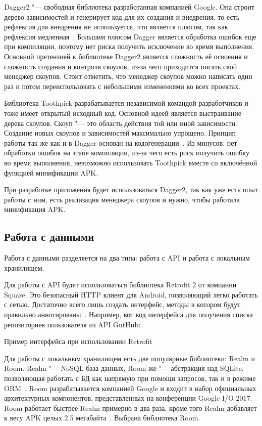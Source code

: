 Dagger2 "--- свободная библиотека разработанная компанией Google.
Она строит дерево зависимостей и генерирует код для их создания и внедрения, то есть рефлексия для внедрения не используется, что является плюсом, так как рефлексия медленная~\cite{dagger}.
Большим плюсом Dagger является обработка ошибок еще при компиляции, поэтому нет риска получить исключение во время выполнения.
Основной претензией к библиотеке Dagger2 является сложность её освоения и сложность создания и контроля скоупов, из-за чего приходится писать свой менеджер скоупов.
Стоит отметить, что менеджер скоупов можно написать один раз и потом переиспользовать с небольшими изменениями во всех проектах.

Библиотека Toothpick разрабатывается независимой командой разработчиков и тоже имеет открытый исходный код.
Основной идеей является выстраивание дерева скоупов.
Скоуп "--- это область действия той или иной зависимости.
Создание новых скоупов и зависимостей максимально упрощено.
Принцип работы так же как и в Dagger основан на кодогенерации~\cite{github:tp}.
Из минусов: нет обработки ошибок на этапе компиляции, из-за чего есть риск получить ошибку во время выполнения, невозможно использовать Toothpick вместе со включённой функцией минификации APK\@.

При разработке приложения будет использоваться Dagger2, так как уже есть опыт работы с ним, есть реализация менеджера скоупов и нужно, чтобы работала минификация APK\@.

\subsection{Работа с данными}
\label{subsec:workWithData}
Работа с данными разделяется на два типа: работа с API и работа с локальным хранилищем.

Для работы с API будет использоваться библиотека Retrofit 2 от компании Square.
Это безопасный HTTP клиент для Android, позволяющий легко работать с сетью.
Достаточно всего лишь создать интерфейс, методы в котором будут правильно аннотированы~\cite{retrofit}.
Например, вот код интерфейса для получения списка репозиториев пользователя из API GutHub:

\begin{listing}[H]
  \caption{Пример интерфейса при использовании Retrofit}
  \label{lst:retrofitKt}
\end{listing}

Для работы с локальным хранилищем есть две популярные библиотеки: Realm и Room.
Realm "--- NoSQL база данных, Room же "--- абстракция над SQLite, позволяющая работать с БД как напрямую при помощи запросов, так и в режиме ORM~\cite{realm,android:room}.
Room разрабатывается компанией Google и входит в набор официальных архитектурных компонентов, представленных на конференции Google I/O 2017.
Room работает быстрее Realm примерно в два раза, кроме того Realm добавляет к весу APK целых 2.5 мегабайта~\cite{github:dbBench}.
Выбрана библиотека Room.

